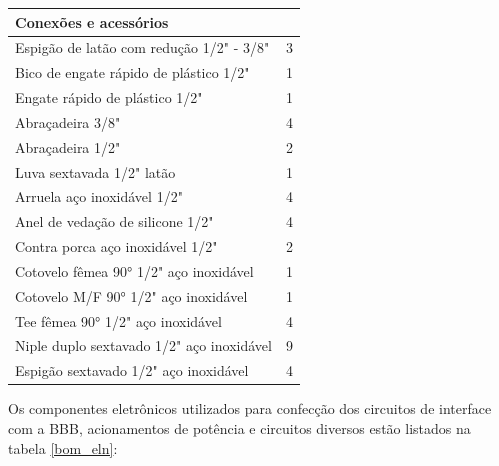 \begin{center}
\begin{table}[H]
\begin{tabular}{ | M{13cm} | M{2cm} |}
			\textbf{Conexões e acessórios} & \\ \hline
			Espigão de latão com redução 1/2" - 3/8" & 3\\ \hline
			Bico de engate rápido de plástico 1/2" & 1\\ \hline
			Engate rápido de plástico 1/2" & 1\\ \hline
			Abraçadeira 3/8" & 4\\ \hline
			Abraçadeira 1/2" & 2\\ \hline
			Luva sextavada 1/2" latão & 1\\ \hline
			Arruela aço inoxidável 1/2" & 4\\ \hline
			Anel de vedação de silicone 1/2" & 4\\ \hline
			Contra porca aço inoxidável 1/2" & 2\\ \hline
			Cotovelo fêmea 90\si{\degree} 1/2" aço inoxidável & 1\\ \hline
			Cotovelo M/F 90\si{\degree} 1/2" aço inoxidável & 1\\ \hline
			Tee fêmea 90\si{\degree} 1/2" aço inoxidável & 4\\ \hline
			Niple duplo sextavado 1/2" aço inoxidável & 9\\ \hline
			Espigão sextavado 1/2" aço inoxidável & 4\\ \hline 
		\end{tabular}
	\end{table}
\end{center}

Os componentes eletrônicos utilizados para confecção dos circuitos de interface com a BBB, acionamentos de potência e circuitos diversos estão listados na tabela \ref{bom_eln}:

